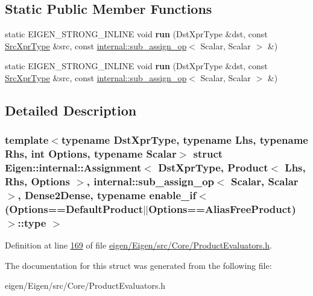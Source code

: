 \subsection*{Static Public Member Functions}
\begin{DoxyCompactItemize}
\item 
\mbox{\label{struct_eigen_1_1internal_1_1_assignment_3_01_dst_xpr_type_00_01_product_3_01_lhs_00_01_rhs_00_01ed0bc91f79379e8268cc6b22ba7de0c6_a22afc17b68523d7cb996c6976ab19be8}} 
static E\+I\+G\+E\+N\+\_\+\+S\+T\+R\+O\+N\+G\+\_\+\+I\+N\+L\+I\+NE void {\bfseries run} (Dst\+Xpr\+Type \&dst, const \hyperlink{group___core___module_class_eigen_1_1_product}{Src\+Xpr\+Type} \&src, const \hyperlink{struct_eigen_1_1internal_1_1sub__assign__op}{internal\+::sub\+\_\+assign\+\_\+op}$<$ Scalar, Scalar $>$ \&)
\item 
\mbox{\label{struct_eigen_1_1internal_1_1_assignment_3_01_dst_xpr_type_00_01_product_3_01_lhs_00_01_rhs_00_01ed0bc91f79379e8268cc6b22ba7de0c6_a22afc17b68523d7cb996c6976ab19be8}} 
static E\+I\+G\+E\+N\+\_\+\+S\+T\+R\+O\+N\+G\+\_\+\+I\+N\+L\+I\+NE void {\bfseries run} (Dst\+Xpr\+Type \&dst, const \hyperlink{group___core___module_class_eigen_1_1_product}{Src\+Xpr\+Type} \&src, const \hyperlink{struct_eigen_1_1internal_1_1sub__assign__op}{internal\+::sub\+\_\+assign\+\_\+op}$<$ Scalar, Scalar $>$ \&)
\end{DoxyCompactItemize}


\subsection{Detailed Description}
\subsubsection*{template$<$typename Dst\+Xpr\+Type, typename Lhs, typename Rhs, int Options, typename Scalar$>$\newline
struct Eigen\+::internal\+::\+Assignment$<$ Dst\+Xpr\+Type, Product$<$ Lhs, Rhs, Options $>$, internal\+::sub\+\_\+assign\+\_\+op$<$ Scalar, Scalar $>$, Dense2\+Dense, typename enable\+\_\+if$<$(\+Options==\+Default\+Product$\vert$$\vert$\+Options==\+Alias\+Free\+Product)$>$\+::type $>$}



Definition at line \hyperlink{eigen_2_eigen_2src_2_core_2_product_evaluators_8h_source_l00169}{169} of file \hyperlink{eigen_2_eigen_2src_2_core_2_product_evaluators_8h_source}{eigen/\+Eigen/src/\+Core/\+Product\+Evaluators.\+h}.



The documentation for this struct was generated from the following file\+:\begin{DoxyCompactItemize}
\item 
eigen/\+Eigen/src/\+Core/\+Product\+Evaluators.\+h\end{DoxyCompactItemize}
